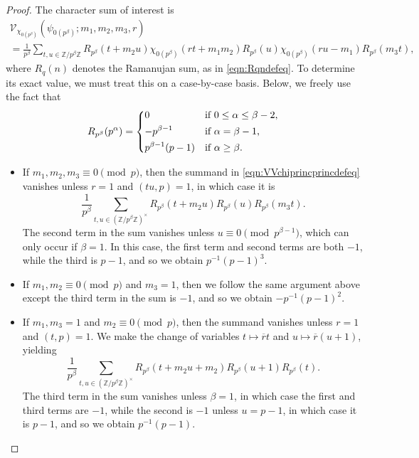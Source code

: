 \documentclass[10pt,a4paper]{amsart}
\newcommand{\VV}{\mathcal{V}}
\newcommand{\Z}{\mathbb{Z}}
\begin{document}
\begin{proof}
The character sum of interest is
\begin{multline}
\label{eqn:VVchiprincprincdefeq}
\VV_{\chi_{0(p^{\beta})}}(\psi_{0(p^{\beta})};m_1,m_2,m_3,r)	\\
= \frac{1}{p^{\beta}} \sum_{t,u \in \Z/p^{\beta}\Z} R_{p^{\beta}}(t + m_2 u) \chi_{0(p^{\beta})}(rt + m_1 m_2) R_{p^{\beta}}(u) \chi_{0(p^{\beta})}(ru - m_1) R_{p^{\beta}}(m_3 t),
\end{multline}
where $R_q(n)$ denotes the Ramanujan sum, as in \eqref{eqn:Rqndefeq}. To determine its exact value, we must treat this on a case-by-case basis. Below, we freely use the fact that
\begin{equation}
\label{eqn:Rpbetapalphadefeq}
R_{p^{\beta}}(p^{\alpha}) = \begin{dcases*}
0 & if $0 \leq \alpha \leq \beta - 2$,	\\
-p^{\beta - 1} & if $\alpha = \beta - 1$,	\\
p^{\beta - 1}(p - 1) & if $\alpha \geq \beta$.
\end{dcases*}
\end{equation}
\begin{itemize}[leftmargin=*]
\item If $m_1,m_2,m_3 \equiv 0 \pmod{p}$, then the summand in \eqref{eqn:VVchiprincprincdefeq} vanishes unless $r = 1$ and $(tu,p) = 1$, in which case it is
\[\frac{1}{p^{\beta}} \sum_{t,u \in (\Z/p^{\beta}\Z)^{\times}} R_{p^{\beta}}(t + m_2 u) R_{p^{\beta}}(u) R_{p^{\beta}}(m_3 t).\]
The second term in the sum vanishes unless $u \equiv 0 \pmod{p^{\beta - 1}}$, which can only occur if $\beta = 1$. In this case, the first term and second terms are both $-1$, while the third is $p - 1$, and so we obtain $p^{-1} (p - 1)^3$.
\item If $m_1,m_2 \equiv 0 \pmod{p}$ and $m_3 = 1$, then we follow the same argument above except the third term in the sum is $-1$, and so we obtain $-p^{-1} (p - 1)^2$.
\item If $m_1, m_3 = 1$ and $m_2 \equiv 0 \pmod{p}$, then the summand vanishes unless $r = 1$ and $(t,p) = 1$. We make the change of variables $t \mapsto \overline{r} t$ and $u \mapsto \overline{r} (u + 1)$, yielding
\[\frac{1}{p^{\beta}} \sum_{t,u \in (\Z/p^{\beta}\Z)^{\times}} R_{p^{\beta}}(t + m_2 u + m_2) R_{p^{\beta}}(u + 1) R_{p^{\beta}}(t).\]
The third term in the sum vanishes unless $\beta = 1$, in which case the first and third terms are $-1$, while the second is $-1$ unless $u = p - 1$, in which case it is $p - 1$, and so we obtain $p^{-1} (p - 1)$.

\end{itemize}
\end{proof}
\end{document}
